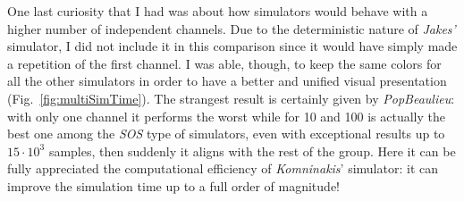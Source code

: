 One last curiosity that I had was about how simulators would behave with a higher number of independent channels. Due to the deterministic nature of \textit{Jakes'} simulator, I did not include it in this comparison since it would have simply made a repetition of the first channel. I was able, though, to keep the same colors for all the other simulators in order to have a better and unified visual presentation (Fig.~\ref{fig:multiSimTime}). The strangest result is certainly given by \textit{PopBeaulieu}: with only one channel it performs the worst while for 10 and 100 is actually the best one among the \textit{SOS} type of simulators, even with exceptional results up to $15 \cdot 10^3$ samples, then suddenly it aligns with the rest of the group. Here it can be fully appreciated the computational efficiency of \textit{Komninakis}' simulator: it can improve the simulation time up to a full order of magnitude!
